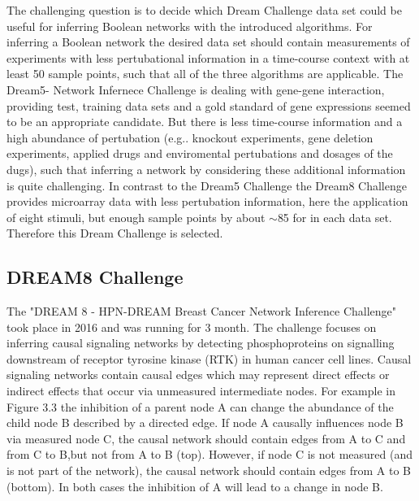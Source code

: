 The challenging question is to decide which Dream Challenge data set could be useful for inferring Boolean networks with the introduced algorithms. For inferring a Boolean network the desired data set should contain measurements of experiments with less pertubational information in a time-course context with at least 50 sample points, such that all of the three algorithms are applicable. 
The Dream5- Network Infernece Challenge is dealing with gene-gene interaction, providing test, training data sets and a gold standard of gene expressions seemed to be an appropriate candidate. But there is less time-course information and a high abundance of pertubation (\gls{e.g.}. knockout experiments, gene deletion experiments, applied drugs and enviromental pertubations and dosages of the dugs), such that inferring a network by considering these additional information is quite challenging. In contrast to the Dream5 Challenge the Dream8 Challenge provides microarray data with less pertubation information, here the application of eight stimuli, but enough sample points  by about $\sim $85 for in each data set. Therefore this Dream Challenge is selected.

\subsection{DREAM8 Challenge}
The "DREAM 8 - HPN-DREAM Breast Cancer Network Inference Challenge" took place in 2016 and was running for 3 month. The challenge focuses on inferring causal signaling networks by detecting phosphoproteins on signalling downstream of receptor tyrosine kinase (RTK) in human cancer cell lines.
Causal signaling networks contain causal edges which may represent direct effects or indirect effects that occur via unmeasured intermediate nodes. For example in Figure 3.3 the inhibition of a parent node A can change the abundance of the child node B described by a directed edge. If node A causally influences node B via measured node C, the causal network should contain edges from A to C and from C to B,but not from A to B (top). However, if node C is not measured (and is not part of the network), the causal network should contain edges from A to B (bottom). In both cases the inhibition of A will lead to a change in node B.

